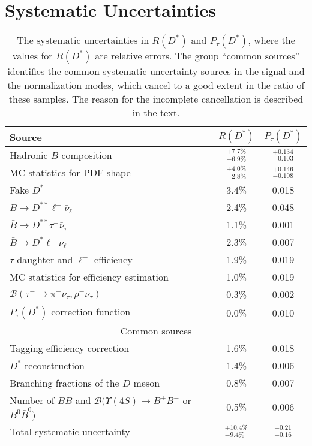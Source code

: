 \documentclass[aps,prd,twocolumn,superscriptaddress,showpacs,preprintnumbers,amsmath,amssymb]{revtex4-1}
\begin{document}
\section{Systematic Uncertainties}\label{sec:syst}

\begin{table*}[t!]
  \centering
  \caption{The systematic uncertainties in $R(D^*)$ and $P_\tau(D^*)$, where the values for $R(D^*)$ are relative errors. The group ``common sources'' identifies the common systematic uncertainty sources in the signal and the normalization modes, which cancel to a good extent in the ratio of these samples. The reason for the incomplete cancellation is described in the text.}
  \vspace{3mm}
  \begin{tabular}{@{\hspace{0.5cm}}l@{\hspace{0.5cm}}|@{\hspace{0.5cm}}c@{\hspace{0.5cm}}@{\hspace{0.5cm}}c@{\hspace{0.5cm}}}
    \hline
    \hline
    Source & $R(D^*)$ & $P_{\tau}(D^*)$\\
    \hline
    Hadronic $B$ composition                 & $^{+7.7\%}_{-6.9\%}$ & $^{+0.134}_{-0.103}$\\
    MC statistics for PDF shape              & $^{+4.0\%}_{-2.8\%}$ & $^{+0.146}_{-0.108}$\\
    Fake $D^*$                               & 3.4\% & 0.018\\
    ${\bar B} \rightarrow D^{**} \ell^- {\bar \nu}_\ell$   & 2.4\% & 0.048\\
    ${\bar B} \rightarrow D^{**} \tau^- {\bar \nu}_\tau$   & 1.1\% & 0.001\\
    ${\bar B} \rightarrow D^* \ell^- {\bar \nu}_\ell$      & 2.3\% & 0.007\\
    $\tau$ daughter and $\ell^-$ efficiency  & 1.9\% & 0.019\\
    MC statistics for efficiency estimation  & 1.0\% & 0.019\\
    $\mathcal{B}(\tau^- \rightarrow \pi^- \nu_\tau, \rho^- \nu_\tau)$ & 0.3\% & 0.002\\
    $P_{\tau}(D^*)$ correction function      & 0.0\% & 0.010\\
    \hline
    \multicolumn{3}{c}{Common sources}\\
    \hline
    Tagging efficiency correction            & 1.6\% & 0.018\\
    $D^*$ reconstruction                     & 1.4\% & 0.006\\
    Branching fractions of the $D$ meson     & 0.8\% & 0.007\\
    Number of $B{\bar B}$ and $\mathcal{B}(\Upsilon(4S) \rightarrow B^+B^-$ or $B^0 \bar{B}^0)$ & 0.5\% & 0.006\\
    \hline
    Total systematic uncertainty & $^{+10.4\%}_{-9.4\%}$ & $^{+0.21}_{-0.16}$\\
    \hline
    \hline
  \end{tabular}
  \label{tab:syst-final}
\end{table*}
\end{document}

